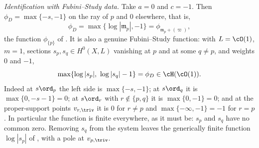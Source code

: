 \begin{example}
\emph{Identification with Fubini--Study data.}  Take $a=0$ and $c=-1$.
Then $\phi_D=\max\{-s,-1\}$ on the ray of $p$ and $0$ elsewhere, that
is,
\[
 \phi_D=\max\{\log|\mathfrak m_p|,-1\}
 =\phi_{\mathfrak m_p+(\varpi)},
\]
the function $\phi_{\{p\}}$ of .  It is also a
genuine Fubini--Study function: with $L=\cO(1)$, $m=1$, sections
$s_p,s_q\in H^0(X,L)$ vanishing at $p$ and at some $q\ne p$, and
weights $0$ and $-1$,
\begin{equation}
\label{eq:ch34-segment-fs}
 \max\{\log|s_p|,\ \log|s_q|-1\}=\phi_D\in\cH(\cO(1)).
\end{equation}
Indeed at $s\ord_p$ the left side is $\max\{-s,-1\}$; at $s\ord_q$ it
is $\max\{0,-s-1\}=0$; at $s\ord_r$ with $r\notin\{p,q\}$ it is
$\max\{0,-1\}=0$; and at the proper-support points $v_{r,\triv}$ it is
$0$ for $r\ne p$ and $\max\{-\infty,-1\}=-1$ for $r=p$.  In
particular the function is finite everywhere, as it must be: $s_p$ and
$s_q$ have no common zero.  Removing $s_q$ from the system leaves the
generically finite function $\log|s_p|$ of , with a
pole at $v_{p,\triv}$.
\end{example}

